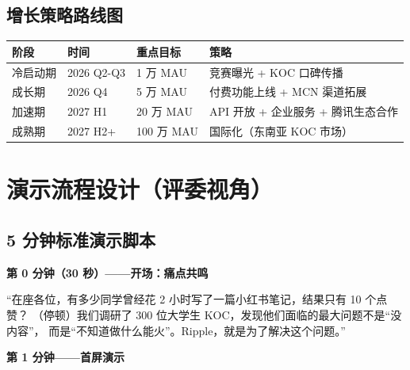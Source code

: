 \documentclass[12pt,a4paper]{ctexart}
\begin{document}
\subsection{增长策略路线图}

\begin{center}
\begin{tabular}{p{2.5cm} p{3.5cm} p{3.5cm} p{4cm}}
\toprule
\textbf{阶段} & \textbf{时间} & \textbf{重点目标} & \textbf{策略} \\
\midrule
冷启动期 & 2026 Q2-Q3 & 1 万 MAU & 竞赛曝光 + KOC 口碑传播 \\[2pt]
成长期 & 2026 Q4 & 5 万 MAU & 付费功能上线 + MCN 渠道拓展 \\[2pt]
加速期 & 2027 H1 & 20 万 MAU & API 开放 + 企业服务 + 腾讯生态合作 \\[2pt]
成熟期 & 2027 H2+ & 100 万 MAU & 国际化（东南亚 KOC 市场）\\
\bottomrule
\end{tabular}
\end{center}


\newpage
\begin{center}
\end{center}

\section{演示流程设计（评委视角）}

\subsection{5 分钟标准演示脚本}

\textbf{第 0 分钟（30 秒）——开场：痛点共鸣}

``在座各位，有多少同学曾经花 2 小时写了一篇小红书笔记，结果只有 10 个点赞？
（停顿）我们调研了 300 位大学生 KOC，发现他们面临的最大问题不是``没内容''，
而是``不知道做什么能火''。Ripple，就是为了解决这个问题。''

\textbf{第 1 分钟——首屏演示}
\end{document}
